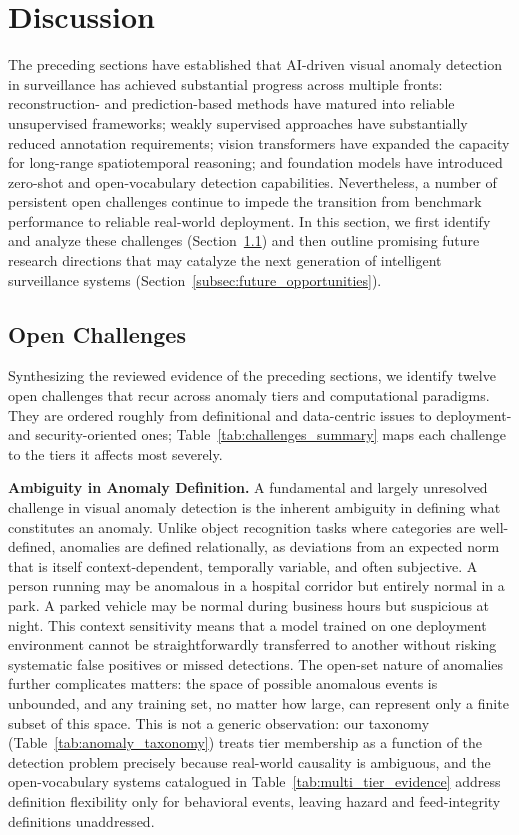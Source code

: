\documentclass[10pt,a4paper]{article}
\begin{document}
\section{Discussion}
\label{sec:discussion}

The preceding sections have established that AI-driven visual anomaly detection in surveillance has achieved substantial progress across multiple fronts: reconstruction- and prediction-based methods have matured into reliable unsupervised frameworks; weakly supervised approaches have substantially reduced annotation requirements; vision transformers have expanded the capacity for long-range spatiotemporal reasoning; and foundation models have introduced zero-shot and open-vocabulary detection capabilities. Nevertheless, a number of persistent open challenges continue to impede the transition from benchmark performance to reliable real-world deployment. In this section, we first identify and analyze these challenges (Section~\ref{subsec:open_challenges}) and then outline promising future research directions that may catalyze the next generation of intelligent surveillance systems (Section~\ref{subsec:future_opportunities}).


\subsection{Open Challenges}
\label{subsec:open_challenges}

Synthesizing the reviewed evidence of the preceding sections, we identify twelve open challenges that recur across anomaly tiers and computational paradigms. They are ordered roughly from definitional and data-centric issues to deployment- and security-oriented ones; Table~\ref{tab:challenges_summary} maps each challenge to the tiers it affects most severely.

\noindent\textbf{Ambiguity in Anomaly Definition.} A fundamental and largely unresolved challenge in visual anomaly detection is the inherent ambiguity in defining what constitutes an anomaly. Unlike object recognition tasks where categories are well-defined, anomalies are defined relationally, as deviations from an expected norm that is itself context-dependent, temporally variable, and often subjective. A person running may be anomalous in a hospital corridor but entirely normal in a park. A parked vehicle may be normal during business hours but suspicious at night. This context sensitivity means that a model trained on one deployment environment cannot be straightforwardly transferred to another without risking systematic false positives or missed detections. The open-set nature of anomalies further complicates matters: the space of possible anomalous events is unbounded, and any training set, no matter how large, can represent only a finite subset of this space.  This is not a generic observation: our taxonomy (Table~\ref{tab:anomaly_taxonomy}) treats tier membership as a function of the detection problem precisely because real-world causality is ambiguous, and the open-vocabulary systems catalogued in Table~\ref{tab:multi_tier_evidence} address definition flexibility only for behavioral events, leaving hazard and feed-integrity definitions unaddressed.
\end{document}
